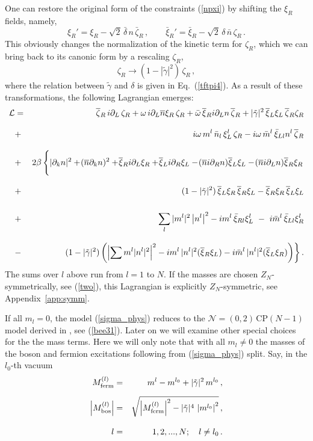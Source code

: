 \documentclass[epsfig,12pt]{article}
\def\beq{\begin{equation}}
\def\eeq{\end{equation}}
\def\beqn{\begin{eqnarray}}
\def\eeqn{\end{eqnarray}}
\newcommand{\nzt}{${\mathcal N}=(0,2)\,$}
\newcommand{\cpn}{CP$(N-1)\,$}
\newcommand{\cell}{{\mathcal L}}
\newcommand{\pt}{\partial}
\newcommand{\zn}{$Z_N$}
\def\beqn{\begin{eqnarray}}
\def\eeqn{\end{eqnarray}}
\def\beq{\begin{equation}}
\def\eeq{\end{equation}}
\newcommand{\p}{\partial}
\newcommand{\ov}{\overline}
\newcommand{\bxir}{\ov{\xi}{}_R}
\newcommand{\bxil}{\ov{\xi}{}_L}
\newcommand{\xir}{\xi_R}
\newcommand{\xil}{\xi_L}
\newcommand{\bzr}{\ov{\zeta}{}_R}
\newcommand{\zr}{\zeta_R}
\newcommand{\nbar}{\ov{n}}
\begin{document}
One can restore the original form of 
the constraints (\ref{npxi})  by   shifting  the $ \xir $ fields, namely,
\beq
\xi_R'= \xir - \sqrt{2}\, \bar{\delta}\, n\, \bar\zeta_R\,, \qquad
\bar\xi_R'= \bar\xi_R - \sqrt{2}\, {\delta}\, \bar{n}\, \zeta_R\,.
\label{wtpi7}
\eeq
This obviously changes the normalization of the kinetic term for $ \zr $, which we can
bring back to its canonic form by a rescaling $ \zr $,
\beq
	\zr  \to   ( 1 - |\tilde\gamma|^2 )\, \zr\,,
	\label{wtpi8}
\eeq
where the relation between $\tilde\gamma$ and $\delta$
is given in Eq.~(\ref{tftpi4}).
As a result of these transformations,  the following Lagrangian emerges:
\beqn
\cell 
&=&
 \bzr\, i\pt_L\, \zr
+\omega\, i\pt_L\nbar \xir\, \zr + \bar{\omega}\, \bxir i\p_L n\, \bzr
+ |\tilde\gamma|^2\, \bxil \xil\, \bzr \zr
	\nonumber\\[3mm]
	&+&
 i\omega\, m^l\, \bar{n}_l \, \xi_L^l\, \zr 
	- i\omega\, \bar{m}^l\, \bar{\xi}_{Ll} n^l\, \bzr
\nonumber\\[3mm]
&+&
2\beta \left\{\rule{0mm}{6mm}
		| \pt_k n |^2  +\! (\nbar  \p_k n)^2 + \! \bxir i\p_L \xir +\! \bxil  i\p_R \xil
	-\!  (\nbar  i\p_R n)  \bxil \xil - \! (\nbar  i\p_L n) \bxir \xir
	\right.
\nonumber\\[3mm]
&+& (1-|\tilde\gamma|^2)\,\bxil\xir\,\bxir\xil - \bxir\xir\,\bxil\xil
	\nonumber\\[5mm]
&+&
  \sum_l |m^l|^2 \left|n^l \right|^2 
- i m^l\, \bar{\xi}_{Rl} \xi_L^l ~-~ i\bar{m}^l\, \bar{\xi}_{Ll} \xi_R^l
\nonumber\\[3mm]
&-&
\left.
 (1-|\tilde\gamma|^2)
	\left(
	 \left|\sum m^l |n^l|^2 \right|^2 
		- i m^l\, |n^l|^2 (\bxir\xil) - i\bar{m}^l\, |n^l|^2(\bxil\xir)
	\right) \right\}.
	\label{sigma_phys}
\eeqn
The sums over $l$ above run from $l=1$ to $N$. If the masses are chosen \zn-symmetrically, see
(\ref{two}), this Lagrangian is explicitly \zn-symmetric, see  Appendix~\ref{app:symm}.

If all $m_l=0$,  the model (\ref{sigma_phys}) reduces to the \nzt \cpn model
derived in \cite{SY1}, see (\ref{bee31}). 
Later on we will examine
other special choices for the  the mass terms. Here we will only note that
with all $m_l \neq 0$ the masses of the boson and fermion excitations following from
(\ref{sigma_phys}) split. Say, in the $l_0$-th vacuum
\beqn
M_{\rm ferm}^{(l)} 
&=&
 m^l - m^{l_0} + |\tilde\gamma|^2\,m^{l_0} \,,
	\nonumber\\[2mm]
	\left| M_{\rm bos}^{(l)} \right|
	&=&
	\sqrt{ \left| M^{(l)}_{\rm ferm} \right|^2 - |\tilde\gamma|^4\, \left| m^{l_0}\right|^2}
	\,,
	\nonumber\\[3mm]
	l
	&=&
	 1,2, ..., N;\quad l\neq l_0\,.
\eeqn
\end{document}

